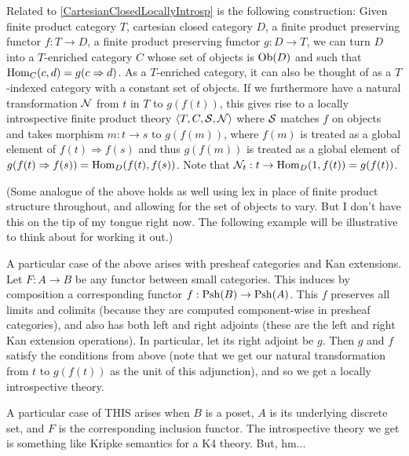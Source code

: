 \begin{TODOblock}
Related to \cref{CartesianClosedLocallyIntrosp} is the following construction: Given finite product category $T$, cartesian closed category $D$, a finite product preserving functor $f : T \to D$, a finite product preserving functor $g: D \to T$, we can turn $D$ into a $T$-enriched category $C$ whose set of objects is $\operatorname{Ob}(D)$ and such that $\operatorname{Hom}_C(c, d) = g(c \Rightarrow d)$. As a $T$-enriched category, it can also be thought of as a $T$-indexed category with a constant set of objects. If we furthermore have a natural transformation $\mathcal{N}$ from $t$ in $T$ to $g(f(t))$, this gives rise to a locally introspective finite product theory $\langle T, C, \mathcal{S}, \mathcal{N} \rangle$ where $\mathcal{S}$ matches $f$ on objects and takes morphism $m : t \to s$ to $g(f(m))$, where $f(m)$ is treated as a global element of $f(t) \Rightarrow f(s)$ and thus $g(f(m))$ is treated as a global element of $g(f(t) \Rightarrow f(s)) = \operatorname{Hom}_D(f(t), f(s))$. Note that $\mathcal{N}_t : t \to \operatorname{Hom}_D(1, f(t)) = g(f(t))$.

(Some analogue of the above holds as well using lex in place of finite product structure throughout, and allowing for the set of objects to vary. But I don't have this on the tip of my tongue right now. The following example will be illustrative to think about for working it out.)

A particular case of the above arises with presheaf categories and Kan extensions. Let $F : A \to B$ be any functor between small categories. This induces by composition a corresponding functor $f : \operatorname{Psh}(B) \to \operatorname{Psh}(A)$. This $f$ preserves all limits and colimits (because they are computed component-wise in presheaf categories), and also has both left and right adjoints (these are the left and right Kan extension operations). In particular, let its right adjoint be $g$. Then $g$ and $f$ satisfy the conditions from above (note that we get our natural transformation from $t$ to $g(f(t))$ as the unit of this adjunction), and so we get a locally introspective theory.

A particular case of THIS arises when $B$ is a poset, $A$ is its underlying discrete set, and $F$ is the corresponding inclusion functor. The introspective theory we get is something like Kripke semantics for a K4 theory. But, hm...


\end{TODOblock}
